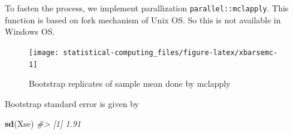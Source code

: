 \documentclass[]{book}
\newenvironment{Shaded}{\begin{snugshade}}{\end{snugshade}}
\newcommand{\CommentTok}[1]{\textcolor[rgb]{0.56,0.35,0.01}{\textit{#1}}}
\newcommand{\ControlFlowTok}[1]{\textcolor[rgb]{0.13,0.29,0.53}{\textbf{#1}}}
\newcommand{\DataTypeTok}[1]{\textcolor[rgb]{0.13,0.29,0.53}{#1}}
\newcommand{\DecValTok}[1]{\textcolor[rgb]{0.00,0.00,0.81}{#1}}
\newcommand{\KeywordTok}[1]{\textcolor[rgb]{0.13,0.29,0.53}{\textbf{#1}}}
\newcommand{\NormalTok}[1]{#1}
\newcommand{\OperatorTok}[1]{\textcolor[rgb]{0.81,0.36,0.00}{\textbf{#1}}}
\newcommand{\StringTok}[1]{\textcolor[rgb]{0.31,0.60,0.02}{#1}}
\theoremstyle{definition}
\theoremstyle{definition}
\theoremstyle{definition}
\theoremstyle{remark}
\begin{document}
To fasten the process, we implement parallization \texttt{parallel::mclapply}. This function is based on fork mechanism of Unix OS. So this is not available in Windows OS.

\begin{Shaded}
\end{Shaded}

\begin{Shaded}
\end{Shaded}

\begin{figure}[H]

{\centering \texttt{[image: statistical-computing\_files/figure-latex/xbarsemc-1]} 

}

\caption{Bootstrap replicates of sample mean done by mclapply}\label{fig:xbarsemc}
\end{figure}

Bootstrap standard error is given by

\begin{Shaded}
\begin{Highlighting}[]
\KeywordTok{sd}\NormalTok{(Xse)}
\CommentTok{#> [1] 1.91}
\end{Highlighting}
\end{Shaded}
\end{document}

